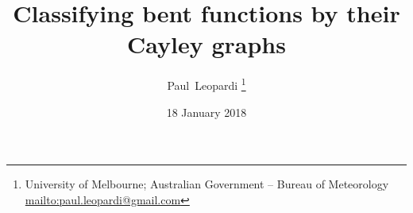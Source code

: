\documentclass[12pt,a4paper]{article}
\title{Classifying bent functions by their Cayley graphs}
\author{
Paul~Leopardi
\thanks{University of Melbourne; Australian Government -- Bureau of Meteorology
\protect\url{mailto:paul.leopardi@gmail.com}}
}
\date{18 January 2018}
\begin{document}
\maketitle

\begin{abstract}

\end{abstract}


\end{document}
